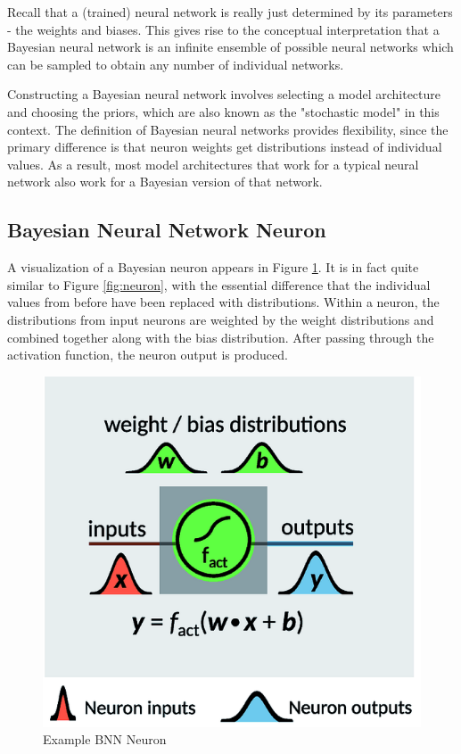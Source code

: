 \documentclass[12pt]{article}
\begin{document}
Recall that a (trained) neural network is really just determined by its parameters - the weights and biases. This gives rise to the conceptual interpretation that a Bayesian neural network is an infinite ensemble of possible neural networks which can be sampled to obtain any number of individual networks. 

Constructing a Bayesian neural network involves selecting a model architecture and choosing the priors, which are also known as the "stochastic model" in this context. The definition of Bayesian neural networks provides flexibility, since the primary difference is that neuron weights get distributions instead of individual values. As a result, most model architectures that work for a typical neural network also work for a Bayesian version of that network. %




\subsection{Bayesian Neural Network Neuron}

A visualization of a Bayesian neuron appears in Figure \ref{fig:bnn-neuron}. It is in fact quite similar to Figure \ref{fig:neuron}, with the essential difference that the individual values from before have been replaced with distributions. Within a neuron, the distributions from input neurons are weighted by the weight distributions and combined together along with the bias distribution. After passing through the activation function, the neuron output is produced. 

\begin{figure}[H]
	\centering
	\includegraphics[width=.55\textwidth]{../Images/BNN-neuron.png}
	\caption{Example BNN Neuron \cite{hase2019machine}}
	\label{fig:bnn-neuron}
\end{figure}
\end{document}
